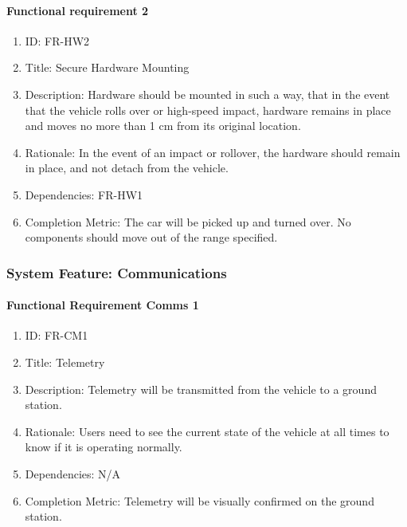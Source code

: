 \documentclass[compsoc,draftclsnofoot,onecolumn,10pt]{IEEEtran}
\begin{document}
	\paragraph{ Functional requirement 2}
		\begin{enumerate}
			\item ID: FR-HW2
			\item Title: Secure Hardware Mounting
			\item Description: Hardware should be mounted in such a way, that in the event that the vehicle rolls over or high-speed impact, hardware remains in place and moves no more than 1 cm from its original location.
			\item Rationale: In the event of an impact or rollover, the hardware should remain in place, and not detach from the vehicle.
			\item Dependencies: FR-HW1
			\item Completion Metric: The car will be picked up and turned over. No components should move out of the range specified. 
		\end{enumerate}

\subsubsection{System Feature: Communications}

	\paragraph{Functional Requirement Comms 1}
		\begin{enumerate}
			\item ID: FR-CM1
			\item Title: Telemetry
			\item Description: Telemetry will be transmitted from the vehicle to a ground station.
			\item Rationale: Users need to see the current state of the vehicle at all times to know if it is operating normally.
			\item Dependencies: N/A
			\item Completion Metric: Telemetry will be visually confirmed on the ground station.
		\end{enumerate}
\end{document}

